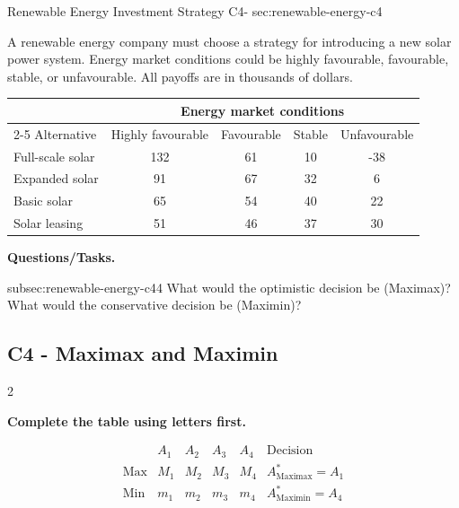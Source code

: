 	\sectionScored
	{Renewable Energy Investment Strategy}
	{C4-}
	{sec:renewable-energy-c4}
	{
		A renewable energy company must choose a strategy for introducing a new
		solar power system. Energy market conditions could be highly favourable,
		favourable, stable, or unfavourable. All payoffs are in thousands of dollars.
			\begin{center}
			\renewcommand{\arraystretch}{1.3}
			\small
			\begin{tabular}{lcccc}
				\toprule
				& \multicolumn{4}{c}{Energy market conditions} \\
				\cmidrule(lr){2-5}
				Alternative & Highly favourable & Favourable & Stable & Unfavourable \\
				\midrule
				Full-scale solar & 132 & 61 & 10 & -38 \\
				Expanded solar & 91 & 67 & 32 & 6 \\
				Basic solar & 65 & 54 & 40 & 22 \\
				Solar leasing & 51 & 46 & 37 & 30 \\
				\bottomrule
			\end{tabular}
		\end{center}
		\vspace{-5mm}
		
		\textbf{Questions/Tasks.}
		\begin{enumerate}
			\CriterionTask
			{subsec:renewable-energy-c4}{4}
			{What would the optimistic decision be (Maximax)? What would the conservative decision be (Maximin)? }
		\end{enumerate}
		
		\label{subsec:renewable-energy-c4}
		\subsection*{C4 - Maximax and Maximin }
		
		
		\begin{multicols}{2}
			
			\textbf{Complete the table using letters first.}
			
			\[
			\begin{array}{c|ccccc}
				& A_1 & A_2 & A_3 & A_4 & \text{Decision}\\
				\hline
				\text{Max} &
				M_1 & M_2 & M_3 & M_4 &
				A^*_{\mathrm{Maximax}}=A_1
				\\
				\text{Min} &
				m_1 & m_2 & m_3 & m_4 &
				A^*_{\mathrm{Maximin}}=A_4
			\end{array}
			\]
			

\end{multicols}}
